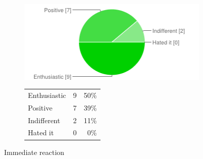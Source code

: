 \documentclass[MSc,paper=a4,pagesize=auto]{icldt}
\begin{document}
\begin{figure}[htbp!]
\centering
\begin{subfigure}{0.4\textwidth}
    \centering
    \includegraphics[width=1\linewidth]{resources/5-immediate_reactino}
\end{subfigure}%
\centering
\begin{subfigure}{0.5\textwidth}
    \centering
   	\begin{tabular}{ l c r }
Enthusiastic&9&50\% \\
Positive&7&39\% \\
Indifferent&2&11\% \\
Hated it&0&0\% \\
\end{tabular}
\end{subfigure} 
    \caption{Immediate reaction}
    \label{fig:5-immediate_reactino}
\end{figure}
\end{document}
